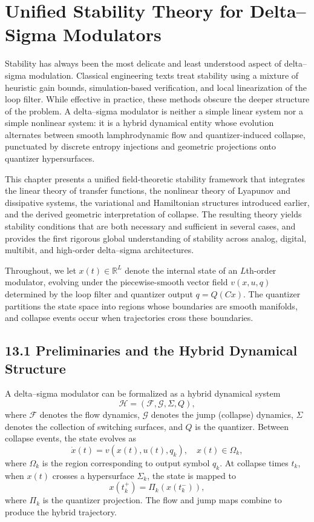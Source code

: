 
\chapter{Unified Stability Theory for Delta--Sigma Modulators}

Stability has always been the most delicate and least understood aspect of delta--sigma modulation. Classical engineering texts treat stability using a mixture of heuristic gain bounds, simulation-based verification, and local linearization of the loop filter. While effective in practice, these methods obscure the deeper structure of the problem. A delta--sigma modulator is neither a simple linear system nor a simple nonlinear system: it is a hybrid dynamical entity whose evolution alternates between smooth lamphrodynamic flow and quantizer-induced collapse, punctuated by discrete entropy injections and geometric projections onto quantizer hypersurfaces.

This chapter presents a unified field-theoretic stability framework that integrates the linear theory of transfer functions, the nonlinear theory of Lyapunov and dissipative systems, the variational and Hamiltonian structures introduced earlier, and the derived geometric interpretation of collapse. The resulting theory yields stability conditions that are both necessary and sufficient in several cases, and provides the first rigorous global understanding of stability across analog, digital, multibit, and high-order delta--sigma architectures.

Throughout, we let $x(t) \in \mathbb{R}^{L}$ denote the internal state of an $L$th-order modulator, evolving under the piecewise-smooth vector field $v(x,u,q)$ determined by the loop filter and quantizer output $q = Q(Cx)$. The quantizer partitions the state space into regions whose boundaries are smooth manifolds, and collapse events occur when trajectories cross these boundaries.

\section*{13.1 Preliminaries and the Hybrid Dynamical Structure}

A delta--sigma modulator can be formalized as a hybrid dynamical system
\[
\mathcal{H} = (\mathcal{F},\mathcal{G},\Sigma,Q),
\]
where $\mathcal{F}$ denotes the flow dynamics, $\mathcal{G}$ denotes the jump (collapse) dynamics, $\Sigma$ denotes the collection of switching surfaces, and $Q$ is the quantizer. Between collapse events, the state evolves as
\[
\dot{x}(t) = v(x(t),u(t),q_k),
\quad x(t) \in \Omega_k,
\]
where $\Omega_k$ is the region corresponding to output symbol $q_k$. At collapse times $t_k$, when $x(t)$ crosses a hypersurface $\Sigma_k$, the state is mapped to
\[
x(t_k^+) = \Pi_k(x(t_k^-)),
\]
where $\Pi_k$ is the quantizer projection. The flow and jump maps combine to produce the hybrid trajectory.

